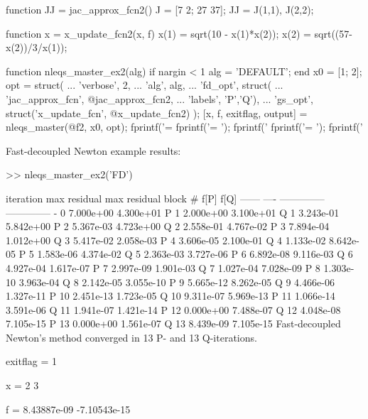 \documentclass[12pt]{article}
\numberwithin{equation}{section}
\numberwithin{table}{section}
\numberwithin{figure}{section}
\begin{document}
\begin{Code}
function JJ = jac_approx_fcn2()
J = [7 2; 27 37];
JJ = {J(1,1), J(2,2)};
\end{Code}

\begin{Code}
function x = x_update_fcn2(x, f)
x(1) = sqrt(10 - x(1)*x(2));
x(2) = sqrt((57-x(2))/3/x(1));
\end{Code}

\begin{Code}
function nleqs_master_ex2(alg)
if nargin < 1
    alg = 'DEFAULT';
end
x0 = [1; 2];
opt = struct( ...
    'verbose', 2, ...
    'alg', alg, ...
    'fd_opt', struct( ...
        'jac_approx_fcn', @jac_approx_fcn2, ...
        'labels', {{'P','Q'}}), ...
    'gs_opt', struct('x_update_fcn', @x_update_fcn2) );
[x, f, exitflag, output] = nleqs_master(@f2, x0, opt);
fprintf('\nexitflag = %
fprintf('\nx = \n');
fprintf('   %
fprintf('\nf = \n');
fprintf('   %
\end{Code}

\clearpage
\noindent Fast-decoupled Newton example results:
\begin{Code}
>> nleqs_master_ex2('FD')    

 iteration    max residual    max residual 
block    #        f[P]            f[Q]     
------ ----  --------------  --------------
  -      0       7.000e+00       4.300e+01
  P      1       2.000e+00       3.100e+01
  Q      1       3.243e-01       5.842e+00
  P      2       5.367e-03       4.723e+00
  Q      2       2.558e-01       4.767e-02
  P      3       7.894e-04       1.012e+00
  Q      3       5.417e-02       2.058e-03
  P      4       3.606e-05       2.100e-01
  Q      4       1.133e-02       8.642e-05
  P      5       1.583e-06       4.374e-02
  Q      5       2.363e-03       3.727e-06
  P      6       6.892e-08       9.116e-03
  Q      6       4.927e-04       1.617e-07
  P      7       2.997e-09       1.901e-03
  Q      7       1.027e-04       7.028e-09
  P      8       1.303e-10       3.963e-04
  Q      8       2.142e-05       3.055e-10
  P      9       5.665e-12       8.262e-05
  Q      9       4.466e-06       1.327e-11
  P     10       2.451e-13       1.723e-05
  Q     10       9.311e-07       5.969e-13
  P     11       1.066e-14       3.591e-06
  Q     11       1.941e-07       1.421e-14
  P     12       0.000e+00       7.488e-07
  Q     12       4.048e-08       7.105e-15
  P     13       0.000e+00       1.561e-07
  Q     13       8.439e-09       7.105e-15
Fast-decoupled Newton's method converged in 13 P- and 13 Q-iterations.

exitflag = 1

x = 
    2
    3

f = 
    8.43887e-09
   -7.10543e-15
\end{Code}
\end{document}
